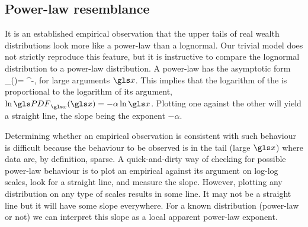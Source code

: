 \subsection{Power-law resemblance}
It is an established empirical observation \cite{Newman2005} that the upper tails of 
real wealth distributions look more like a power-law than a lognormal. Our trivial model does not
strictly reproduce this feature, but it is instructive to compare the lognormal distribution
to a power-law distribution. A power-law \PDFa has the asymptotic form 
\be
\PDF_\x(\x)= \x^{-\alpha},
\ee
for large arguments $\x$. This implies that the logarithm of the \PDFa is proportional 
to the logarithm of its argument, $\ln \PDF_\x(\x) = -\alpha \ln \x$. Plotting
one against the other will yield a straight line, the slope being the exponent $-\alpha$. 

Determining whether an empirical observation is consistent with such behaviour 
is difficult because the behaviour to be observed is in the tail (large $\x$) where data are,
by definition, sparse. A quick-and-dirty way of checking for possible power-law 
behaviour is to plot an empirical \PDFa against its argument on log-log scales, 
look for a straight line, and measure the slope. However, plotting any distribution on any 
type of scales results in some line. It may not be a straight line but it will have some slope 
everywhere. For a known distribution (power-law or not) we can interpret this slope 
as a local apparent power-law exponent. 

